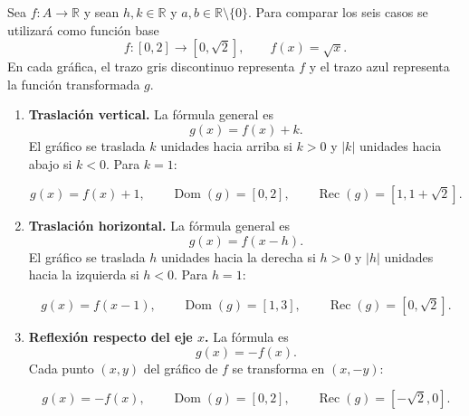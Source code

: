 \begin{proposicion}[de transformación]
Sea $f:A\to\mathbb{R}$ y sean $h,k\in\mathbb{R}$ y $a,b\in\mathbb{R}\setminus\{0\}$. Para comparar los seis casos se utilizará como función base
\[
f:[0,2]\to[0,\sqrt2],\qquad f(x)=\sqrt{x}.
\]
En cada gráfica, el trazo gris discontinuo representa $f$ y el trazo azul representa la función transformada $g$.

\begin{enumerate}
\item \textbf{Traslación vertical.} La fórmula general es
\[
g(x)=f(x)+k.
\]
El gráfico se traslada $k$ unidades hacia arriba si $k>0$ y $|k|$ unidades hacia abajo si $k<0$. Para $k=1$:
\begin{center}
\[
g(x)=f(x)+1,\qquad
\operatorname{Dom}(g)=[0,2],\qquad
\operatorname{Rec}(g)=[1,1+\sqrt2].
\]
\end{center}

\item \textbf{Traslación horizontal.} La fórmula general es
\[
g(x)=f(x-h).
\]
El gráfico se traslada $h$ unidades hacia la derecha si $h>0$ y $|h|$ unidades hacia la izquierda si $h<0$. Para $h=1$:
\begin{center}
\[
g(x)=f(x-1),\qquad
\operatorname{Dom}(g)=[1,3],\qquad
\operatorname{Rec}(g)=[0,\sqrt2].
\]
\end{center}

\item \textbf{Reflexión respecto del eje $x$.} La fórmula es
\[
g(x)=-f(x).
\]
Cada punto $(x,y)$ del gráfico de $f$ se transforma en $(x,-y)$:
\begin{center}
\[
g(x)=-f(x),\qquad
\operatorname{Dom}(g)=[0,2],\qquad
\operatorname{Rec}(g)=[-\sqrt2,0].
\]
\end{center}


\end{enumerate}
\end{proposicion}
